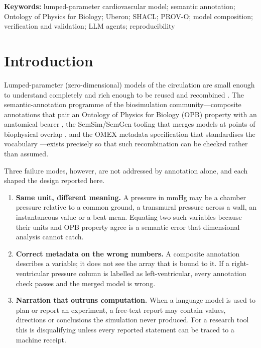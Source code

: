 \documentclass[11pt,letterpaper]{article}
\begin{document}
\noindent\textbf{Keywords:} lumped-parameter cardiovascular model; semantic annotation; Ontology of Physics for Biology; Uberon; SHACL; PROV-O; model composition; verification and validation; LLM agents; reproducibility

\section{Introduction}
\label{sec:intro}

Lumped-parameter (zero-dimensional) models of the circulation are small enough to understand completely and rich enough to be reused and recombined \citep{shi2011lumped,smith2004minimal}. The semantic-annotation programme of the biosimulation community---composite annotations that pair an Ontology of Physics for Biology (OPB) property with an anatomical bearer \citep{gennari2011composite,cook2013opb}, the SemSim/SemGen tooling that merges models at points of biophysical overlap \citep{neal2014reappraisal,neal2015cardiomyocyte,neal2019semgen}, and the OMEX metadata specification that standardises the vocabulary \citep{neal2020omex,gennari2021omex,neal2019harmonizing}---exists precisely so that such recombination can be checked rather than assumed.

Three failure modes, however, are not addressed by annotation alone, and each shaped the design reported here.

\begin{enumerate}[leftmargin=*]
\item \textbf{Same unit, different meaning.} A pressure in mmHg may be a chamber pressure relative to a common ground, a transmural pressure across a wall, an instantaneous value or a beat mean. Equating two such variables because their units and OPB property agree is a semantic error that dimensional analysis cannot catch.
\item \textbf{Correct metadata on the wrong numbers.} A composite annotation describes a variable; it does not see the array that is bound to it. If a right-ventricular pressure column is labelled as left-ventricular, every annotation check passes and the merged model is wrong.
\item \textbf{Narration that outruns computation.} When a language model is used to plan or report an experiment, a free-text report may contain values, directions or conclusions the simulation never produced. For a research tool this is disqualifying unless every reported statement can be traced to a machine receipt.
\end{enumerate}
\end{document}
